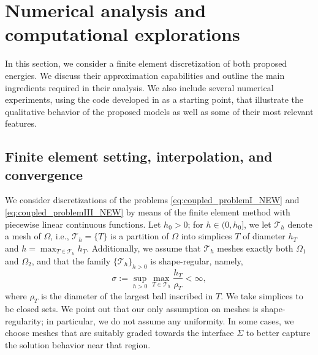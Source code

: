 \documentclass{amsart}
\newcommand{\Ol}{\Omega_{1}}%
\newcommand{\Onl}{\Omega_{2}}%
\newcommand{\Th}{{\mathcal {T}_h}}
\theoremstyle{plain}
\numberwithin{equation}{section}
\numberwithin{table}{section}
\numberwithin{figure}{section}
\numberwithin{theorem}{section}
\numberwithin{corollary}{section}
\numberwithin{definition}{section}
\numberwithin{lemma}{section}
\numberwithin{proposition}{section}
\numberwithin{remark}{section}
\begin{document}
\section{Numerical analysis and computational explorations} \label{sec:experiments}
In this section, we consider a finite element discretization of both proposed energies. We discuss their approximation capabilities and outline the main ingredients required in their analysis. We also include several numerical experiments, using the code developed in \cite{AcBeBo17} as a starting point, that illustrate the qualitative behavior of the proposed models as well as some of their most relevant features.

\subsection{Finite element setting, interpolation, and convergence}

We consider discretizations of the problems \eqref{eq:coupled_problemI_NEW} and \eqref{eq:coupled_problemIII_NEW} by means of the finite element method with piecewise linear continuous functions. 
Let $h_0 > 0$; for $h \in (0, h_0]$, we let $\mathcal{T}_h$ denote a mesh of $\Omega$, i.e., $\mathcal{T}_h = \{T\}$ is a partition of $\Omega$ into simplices $T$ of diameter $h_T$ and $h = \max_{T \in \Th} h_T$. Additionally, we assume that $\mathcal{T}_h$ meshes exactly both $\Ol$ and $\Onl$, and that the family $\{\Th \}_{h>0}$ is shape-regular, namely,
\begin{equation} \label{eq:shape-regularity}
\sigma := \sup_{h>0} \max_{T \in \Th} \frac{h_T}{\rho_T} <\infty,
\end{equation}
where $\rho_T $ is the diameter of the largest ball inscribed in $T$. We take simplices to be closed sets. We point out that our only assumption on meshes is shape-regularity; in particular, we do not assume any uniformity. In some cases, we choose meshes that are suitably graded towards the interface $\Sigma$ to better capture the solution behavior near that region.
\end{document}
